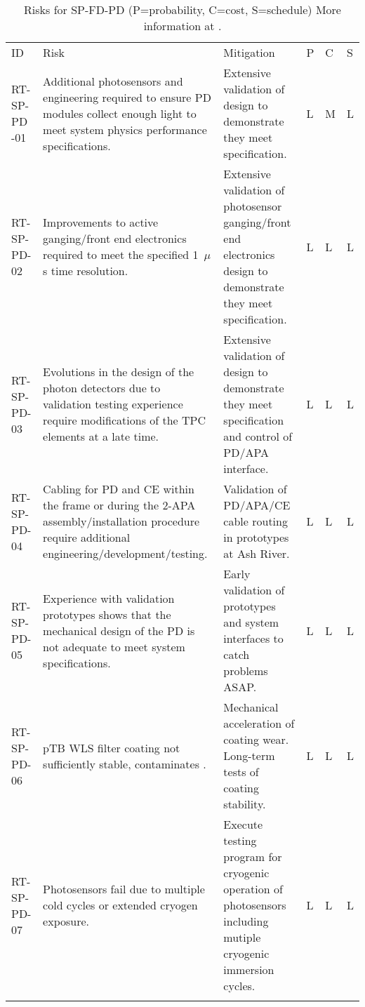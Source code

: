 
\begin{footnotesize}
\begin{longtable}{x{0.18\textwidth}x{0.20\textwidth}x{0.32\textwidth}x{0.02\textwidth}x{0.02\textwidth}x{0.02\textwidth}} 
\caption[Risks for SP-FD-PD]{Risks for SP-FD-PD (P=probability, C=cost, S=schedule) More information at . } \\
ID & Risk & Mitigation & P & C & S  \\  \colhline
RT-SP-PD -01 & Additional photosensors and engineering required to ensure PD modules collect enough light to meet system physics performance specifications. & Extensive validation of  design to demonstrate they meet specification. & L & M & L \\  \colhline
RT-SP-PD-02 & Improvements to active ganging/front end electronics required to meet the specified 1~$\mu$s time resolution. & Extensive validation of photosensor ganging/front end electronics design to demonstrate they meet specification. & L & L & L \\  \colhline
RT-SP-PD-03 & Evolutions in the design of the photon detectors due to validation testing experience require modifications of the TPC elements at a late time. & Extensive validation of  design to demonstrate they meet specification and control of PD/APA interface. & L & L & L \\  \colhline
RT-SP-PD-04 & Cabling for PD and CE within the  frame or during the 2-APA assembly/installation procedure require additional engineering/development/testing. & Validation of PD/APA/CE cable routing in prototypes at Ash River. & L & L & L \\  \colhline
RT-SP-PD-05 & Experience with validation prototypes shows that the mechanical design of the PD is not adequate to meet system specifications. & Early validation of  prototypes and system interfaces to catch problems ASAP. & L & L & L \\  \colhline
RT-SP-PD-06 & pTB WLS filter coating not sufficiently stable, contaminates . & Mechanical acceleration of coating wear.  Long-term tests of coating stability. & L & L & L \\  \colhline
RT-SP-PD-07 & Photosensors fail due to multiple cold cycles or extended cryogen exposure. & Execute testing program for cryogenic operation of photosensors including mutiple cryogenic immersion cycles. & L & L & L \\  \colhline

\end{longtable}
\end{footnotesize}
